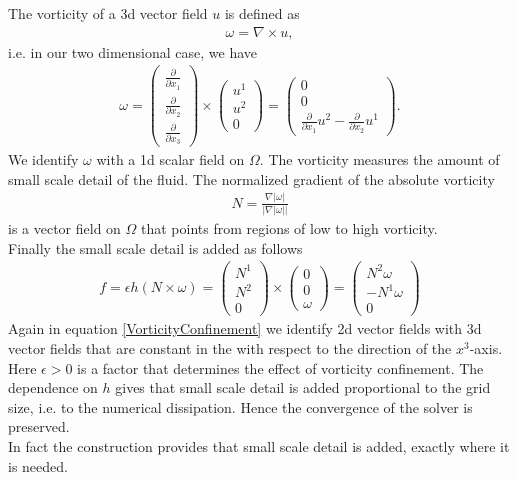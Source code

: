 \documentclass[a4paper,10pt,oneside,final,german,openbib,pdftex,titlepage]{scrbook}
\begin{document}
The vorticity of a 3d vector field $u$ is defined as
\begin{align*}
	\omega = \nabla \times u,
\end{align*}
i.e. in our two dimensional case, we have
\begin{align*}
	\omega = \left( \begin{matrix}
	\frac{\partial}{\partial x_1} \\ \frac{\partial}{\partial x_2} \\ \frac{\partial}{\partial x_3}
	\end{matrix} \right) \times 
	\left( \begin{matrix}
	u^1 \\ u^2 \\ 0
	\end{matrix} \right) = \left( \begin{matrix}
	 0\\ 0 \\ \frac{\partial}{\partial x_1} u^2 - \frac{\partial}{\partial x_2} u^1 
	\end{matrix} \right).
\end{align*}
We identify $\omega$ with a 1d scalar field on $\Omega$. The vorticity measures the amount of small scale detail of the fluid. The normalized gradient of the absolute vorticity
\begin{align*}
	N = \frac{\nabla |\omega |}{|\nabla  |\omega ||}
\end{align*}
is a vector field on $\Omega$ that points from regions of low to high vorticity.\\
Finally the small scale detail is added as follows
\begin{align}
	f = \epsilon h (N\times \omega ) = \left( \begin{matrix}
	N^1\\ N^2 \\0
	\end{matrix}  \right) \times \left( \begin{matrix} 0\\ 0\\ \omega \end{matrix} \right) = \left( \begin{matrix}
	N^2 \omega \\ -N^1 \omega \\ 0
	\end{matrix} \right) \label{VorticityConfinement}
\end{align}
Again in equation \ref{VorticityConfinement} we identify 2d vector fields with 3d vector fields that are constant in the with respect to the direction of the $x^3$-axis.
Here $\epsilon >0$ is a factor that determines the effect of vorticity confinement. The dependence on $h$ gives that small scale detail is added proportional to the grid size, i.e. to the numerical dissipation. Hence the convergence of the solver is preserved.\\
In fact the construction provides that small scale detail is added, exactly where it is needed.
\end{document}
